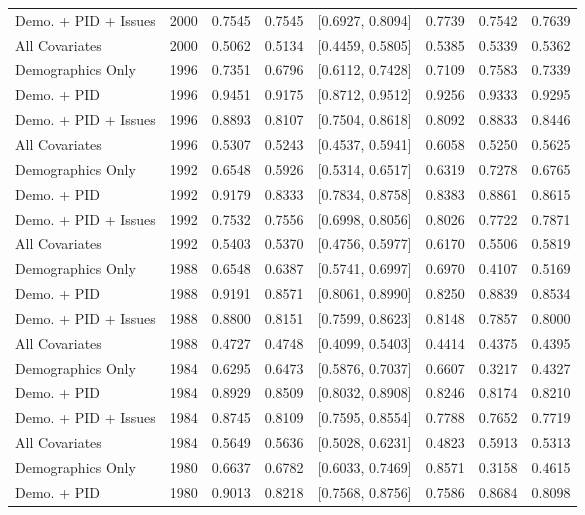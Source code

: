 \begin{longtable}{lrrrlrrr}
  Demo. + PID + Issues & 2000 & 0.7545 & 0.7545 & [0.6927, 0.8094] & 0.7739 & 0.7542 & 0.7639 \\ 
  All Covariates & 2000 & 0.5062 & 0.5134 & [0.4459, 0.5805] & 0.5385 & 0.5339 & 0.5362 \\ 
  Demographics Only & 1996 & 0.7351 & 0.6796 & [0.6112, 0.7428] & 0.7109 & 0.7583 & 0.7339 \\ 
  Demo. + PID & 1996 & 0.9451 & 0.9175 & [0.8712, 0.9512] & 0.9256 & 0.9333 & 0.9295 \\ 
  Demo. + PID + Issues & 1996 & 0.8893 & 0.8107 & [0.7504, 0.8618] & 0.8092 & 0.8833 & 0.8446 \\ 
  All Covariates & 1996 & 0.5307 & 0.5243 & [0.4537, 0.5941] & 0.6058 & 0.5250 & 0.5625 \\ 
  Demographics Only & 1992 & 0.6548 & 0.5926 & [0.5314, 0.6517] & 0.6319 & 0.7278 & 0.6765 \\ 
  Demo. + PID & 1992 & 0.9179 & 0.8333 & [0.7834, 0.8758] & 0.8383 & 0.8861 & 0.8615 \\ 
  Demo. + PID + Issues & 1992 & 0.7532 & 0.7556 & [0.6998, 0.8056] & 0.8026 & 0.7722 & 0.7871 \\ 
  All Covariates & 1992 & 0.5403 & 0.5370 & [0.4756, 0.5977] & 0.6170 & 0.5506 & 0.5819 \\ 
  Demographics Only & 1988 & 0.6548 & 0.6387 & [0.5741, 0.6997] & 0.6970 & 0.4107 & 0.5169 \\ 
  Demo. + PID & 1988 & 0.9191 & 0.8571 & [0.8061, 0.8990] & 0.8250 & 0.8839 & 0.8534 \\ 
  Demo. + PID + Issues & 1988 & 0.8800 & 0.8151 & [0.7599, 0.8623] & 0.8148 & 0.7857 & 0.8000 \\ 
  All Covariates & 1988 & 0.4727 & 0.4748 & [0.4099, 0.5403] & 0.4414 & 0.4375 & 0.4395 \\ 
  Demographics Only & 1984 & 0.6295 & 0.6473 & [0.5876, 0.7037] & 0.6607 & 0.3217 & 0.4327 \\ 
  Demo. + PID & 1984 & 0.8929 & 0.8509 & [0.8032, 0.8908] & 0.8246 & 0.8174 & 0.8210 \\ 
  Demo. + PID + Issues & 1984 & 0.8745 & 0.8109 & [0.7595, 0.8554] & 0.7788 & 0.7652 & 0.7719 \\ 
  All Covariates & 1984 & 0.5649 & 0.5636 & [0.5028, 0.6231] & 0.4823 & 0.5913 & 0.5313 \\ 
  Demographics Only & 1980 & 0.6637 & 0.6782 & [0.6033, 0.7469] & 0.8571 & 0.3158 & 0.4615 \\ 
  Demo. + PID & 1980 & 0.9013 & 0.8218 & [0.7568, 0.8756] & 0.7586 & 0.8684 & 0.8098 \\ 

\end{longtable}

